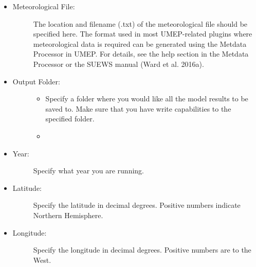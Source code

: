 \documentclass[letterpaper,10pt,english]{sphinxmanual}
\begin{document}
\begin{itemize}
\begin{description}
\end{description}

\item {} \begin{description}
\item[{Meteorological File:}] \leavevmode
The location and filename (.txt) of the meteorological file should be specified here. The format used in most UMEP-related plugins where meteorological data is required can be generated using the Metdata Processor in UMEP. For details, see the help section in the Metdata Processor or the SUEWS manual (Ward et al. 2016a).

\end{description}

\item {} \begin{description}
\item[{Output Folder:}] \leavevmode\begin{itemize}
\item {} 
Specify a folder where you would like all the model results to be saved to. Make sure that you have write capabilities to the specified folder.

\item {} 

\end{itemize}

\end{description}

\item {} \begin{description}
\item[{Year:}] \leavevmode
Specify what year you are running.

\end{description}

\item {} \begin{description}
\item[{Latitude:}] \leavevmode
Specify the latitude in decimal degrees. Positive numbers indicate Northern Hemisphere.

\end{description}

\item {} \begin{description}
\item[{Longitude:}] \leavevmode
Specify the longitude in decimal degrees. Positive numbers are to the West.


\end{description}
\end{itemize}
\end{document}
